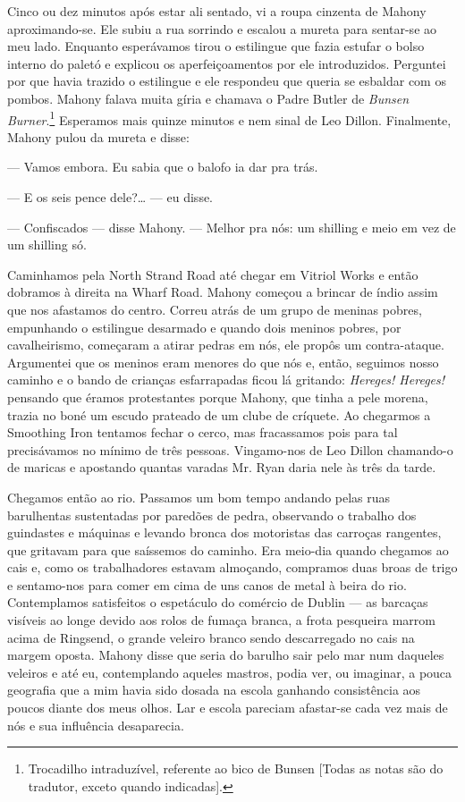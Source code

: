 Cinco ou dez minutos após estar ali sentado, vi a roupa cinzenta de
Mahony aproximando-se. Ele subiu a rua sorrindo e escalou a mureta
para sentar-se ao meu lado. Enquanto esperávamos tirou o estilingue
que fazia estufar o bolso interno do paletó e explicou os
aperfeiçoamentos por ele introduzidos. Perguntei por que havia trazido
o estilingue e ele respondeu que queria se esbaldar com os pombos.
Mahony falava muita gíria e chamava o Padre Butler de \textit{Bunsen
Burner}.\footnote{ Trocadilho intraduzível, referente ao bico de Bunsen
[Todas as notas são do tradutor, exceto quando indicadas].} Esperamos mais quinze minutos e nem sinal de Leo Dillon.
Finalmente, Mahony pulou da mureta e disse:

--- Vamos embora. Eu sabia que o balofo ia dar pra trás.

--- E os seis pence dele?\ldots{} --- eu disse.

--- Confiscados --- disse Mahony. --- Melhor pra nós: um shilling e
meio em vez de um shilling só.

Caminhamos pela North Strand Road até chegar em Vitriol Works e então
dobramos à direita na Wharf Road. Mahony começou a brincar de índio
assim que nos afastamos do centro. Correu atrás de um grupo de meninas
pobres, empunhando o estilingue desarmado e quando dois meninos
pobres, por cavalheirismo, começaram a atirar pedras em nós, ele
propôs um contra-ataque. Argumentei que os meninos eram menores do que
nós e, então, seguimos nosso caminho e o bando de crianças
esfarrapadas ficou lá gritando: \textit{Hereges! Hereges!} pensando que éramos
protestantes porque Mahony, que tinha a pele morena, trazia no boné um
escudo prateado de um clube de críquete. Ao chegarmos a Smoothing Iron
tentamos fechar o cerco, mas fracassamos pois para tal precisávamos
no mínimo de três pessoas. Vingamo-nos de Leo Dillon chamando-o de
maricas e apostando quantas varadas Mr. Ryan daria nele às três da
tarde.

Chegamos então ao rio. Passamos um bom tempo andando pelas ruas
barulhentas sustentadas por paredões de pedra, observando o trabalho
dos guindastes e máquinas e levando bronca dos motoristas das carroças
rangentes, que gritavam para que saíssemos do caminho. Era meio-dia
quando chegamos ao cais e, como os trabalhadores estavam almoçando,
compramos duas broas de trigo e sentamo-nos para comer em cima de uns
canos de metal à beira do rio. Contemplamos satisfeitos o espetáculo
do comércio de Dublin --- as barcaças visíveis ao longe devido aos
rolos de fumaça branca, a frota pesqueira marrom acima de Ringsend, o grande
veleiro branco sendo descarregado no cais na margem oposta. Mahony
disse que seria do barulho sair pelo mar num daqueles veleiros e até
eu, contemplando aqueles mastros, podia ver, ou imaginar, a pouca
geografia que a mim havia sido dosada na escola ganhando consistência
aos poucos diante dos meus olhos. Lar e escola pareciam afastar-se
cada vez mais de nós e sua influência desaparecia.

